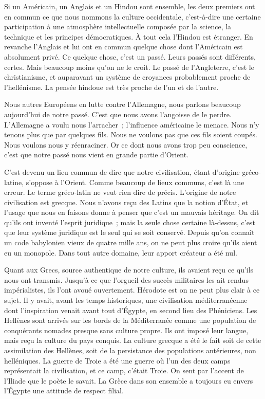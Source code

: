 \documentclass[french,twoside]{book} %
\begin{document}
Si un Américain, un Anglais et un Hindou sont ensemble, les deux pre­miers ont en commun ce que nous nommons la culture occidentale, c'est-à-dire une certaine participation à une atmosphère intellectuelle composée par la science, la technique et les principes démocratiques. À tout cela l'Hindou est étranger. En revanche l'Anglais et lui ont en commun quelque chose dont l'Américain est absolument privé. Ce quelque chose, c'est un passé. Leurs passés sont différents, certes. Mais beaucoup moins qu'on ne le croit. Le passé de l'Angleterre, c'est le christianisme, et auparavant un système de croyances probablement proche de l'hellénisme. La pensée hindoue est très proche de l'un et de l'autre.\par
Nous autres Européens en lutte contre l'Allemagne, nous parlons beaucoup aujourd'hui de notre passé. C'est que nous avons l'angoisse de le perdre. L'Allemagne a voulu nous l'arracher ; l'influence américaine le menace. Nous n'y tenons plus que par quelques fils. Nous ne voulons pas que ces fils soient coupés. Nous voulons nous y réenraciner. Or ce dont nous avons trop peu conscience, c'est que notre passé nous vient en grande partie d'Orient.\par
C'est devenu un lieu commun de dire que notre civilisation, étant d'origine gréco-latine, s'oppose à l'Orient. Comme beaucoup de lieux communs, c'est là une erreur. Le terme gréco-latin ne veut rien dire de précis. L'origine de notre civilisation est grecque. Nous n'avons reçu des Latins que la notion d'État, et l'usage que nous en faisons donne à penser que c'est un mauvais héritage. On dit qu'ils ont inventé l'esprit juridique ; mais la seule chose certaine là-dessus, c'est que leur système juridique est le seul qui se soit conservé. Depuis qu'on connaît un code babylonien vieux de quatre mille ans, on ne peut plus croire qu'ils aient eu un monopole. Dans tout autre domaine, leur apport créateur a été nul.\par
Quant aux Grecs, source authentique de notre culture, ils avaient reçu ce qu'ils nous ont transmis. Jusqu'à ce que l'orgueil des succès militaires les ait rendus impérialistes, ils l'ont avoué ouvertement. Hérodote est on ne peut plus clair à ce sujet. Il y avait, avant les temps historiques, une civilisation méditerranéenne dont l'inspiration venait avant tout d'Égypte, en second lieu des Phéniciens. Les Hellènes sont arrivés sur les bords de la Méditerranée comme une population de conquérants nomades presque sans culture propre. Ils ont imposé leur langue, mais reçu la culture du pays conquis. La culture grecque a été le fait soit de cette assimilation des Hellènes, soit de la persis­tance des populations antérieures, non helléniques. La guerre de Troie a été une guerre où l'un des deux camps représentait la civilisation, et ce camp, c'était Troie. On sent par l'accent de l'Iliade que le poète le savait. La Grèce dans son ensemble a toujours eu envers l'Égypte une attitude de respect filial.\par
\end{document}
